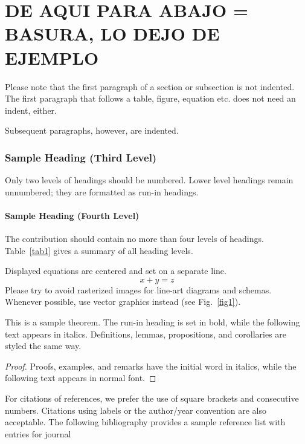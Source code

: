 \documentclass[runningheads]{llncs}
\begin{document}
\section{DE AQUI PARA ABAJO = BASURA, LO DEJO DE EJEMPLO}
Please note that the first paragraph of a section or subsection is
not indented. The first paragraph that follows a table, figure,
equation etc. does not need an indent, either.

Subsequent paragraphs, however, are indented.

\subsubsection{Sample Heading (Third Level)} Only two levels of
headings should be numbered. Lower level headings remain unnumbered;
they are formatted as run-in headings.

\paragraph{Sample Heading (Fourth Level)}
The contribution should contain no more than four levels of
headings. Table~\ref{tab1} gives a summary of all heading levels.

\noindent Displayed equations are centered and set on a separate
line.
\begin{equation}
x + y = z
\end{equation}
Please try to avoid rasterized images for line-art diagrams and
schemas. Whenever possible, use vector graphics instead (see
Fig.~\ref{fig1}).

\begin{theorem}
This is a sample theorem. The run-in heading is set in bold, while
the following text appears in italics. Definitions, lemmas,
propositions, and corollaries are styled the same way.
\end{theorem}
%
%
\begin{proof}
Proofs, examples, and remarks have the initial word in italics,
while the following text appears in normal font.
\end{proof}
For citations of references, we prefer the use of square brackets
and consecutive numbers. Citations using labels or the author/year
convention are also acceptable. The following bibliography provides
a sample reference list with entries for journal
%
%
%
% 
% 
%
\end{document}
